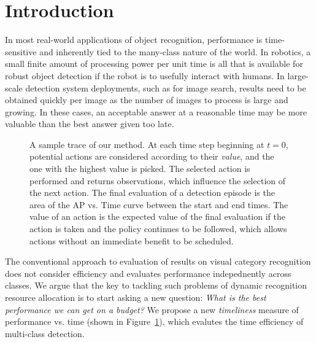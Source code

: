 \section{Introduction}

In most real-world applications of object recognition, performance is time-sensitive and inherently tied to the many-class nature of the world.
In robotics, a small finite amount of processing power per unit time is all that is available for robust object detection if the robot is to usefully interact with humans.
In large-scale detection system deployments, such as for image search, results need to be obtained quickly per image as the number of images to process is large and growing.
In these cases, an acceptable answer at a reasonable time may be more valuable than the best answer given too late.

\begin{figure}[ht!]
  \caption{
A sample trace of our method.
At each time step beginning at $t=0$, potential actions are considered according to their \emph{value}, and the one with the highest value is picked.
The selected action is performed and returns observations, which influence the selection of the next action.
The final evaluation of a detection episode is the area of the AP vs. Time curve between the start and end times.
The value of an action is the expected value of the final evaluation if the action is taken and the policy continues to be followed, which allows actions without an immediate benefit to be scheduled.
}
  \label{fig:figure1}
\end{figure}

The conventional approach to evaluation of results on visual category
recognition does not consider efficiency and evaluates performance
indepednently across classes.  
We argue that the key to tackling such problems of dynamic recognition resource allocation is to start asking a new question:
\emph{What is the best performance we can get on a budget?}
We propose a new \emph{timeliness} measure of performance vs. time (shown in Figure~\ref{fig:figure1}), which evalutes the time efficiency of multi-class detection.

